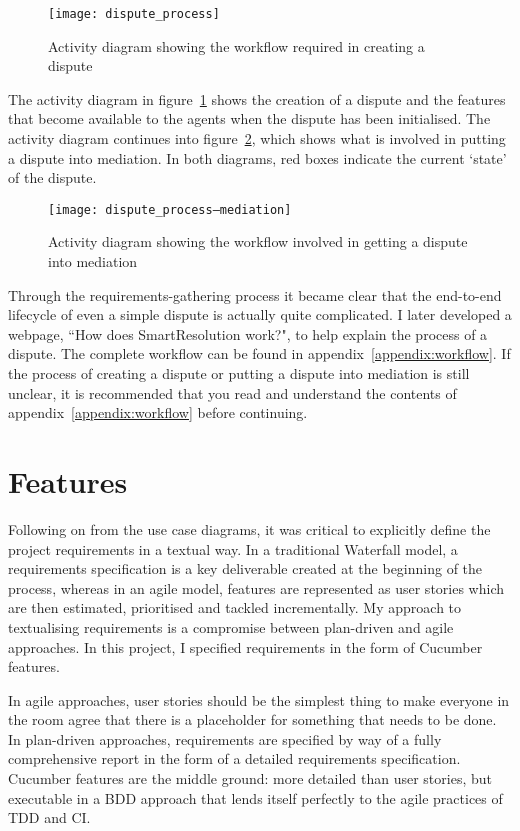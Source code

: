 \begin{figure}[h!]
  \centering
    \ifimages
    \texttt{[image: dispute\_process]}
    \fi
  \caption{Activity diagram showing the workflow required in creating a dispute}
  \label{uml:activity:dispute}
\end{figure}

The activity diagram in figure~\ref{uml:activity:dispute} shows the creation of a dispute and the features that become available to the agents when the dispute has been initialised. The activity diagram continues into figure~\ref{uml:activity:mediation}, which shows what is involved in putting a dispute into mediation. In both diagrams, red boxes indicate the current `state' of the dispute.

\begin{figure}[h!]
  \centering
    \ifimages
    \texttt{[image: dispute\_process--mediation]}
    \fi
  \caption{Activity diagram showing the workflow involved in getting a dispute into mediation}
  \label{uml:activity:mediation}
\end{figure}

Through the requirements-gathering process it became clear that the end-to-end lifecycle of even a simple dispute is actually quite complicated. I later developed a webpage, ``How does SmartResolution work?", to help explain the process of a dispute. The complete workflow can be found in appendix~\ref{appendix:workflow}. If the process of creating a dispute or putting a dispute into mediation is still unclear, it is recommended that you read and understand the contents of appendix~\ref{appendix:workflow} before continuing.

\section{Features}

Following on from the use case diagrams, it was critical to explicitly define the project requirements in a textual way. In a traditional Waterfall model, a requirements specification is a key deliverable created at the beginning of the process, whereas in an agile model, features are represented as user stories which are then estimated, prioritised and tackled incrementally. My approach to textualising requirements is a compromise between plan-driven and agile approaches. In this project, I specified requirements in the form of Cucumber features.

In agile approaches, user stories should be the simplest thing to make everyone in the room agree that there is a placeholder for something that needs to be done. In plan-driven approaches, requirements are specified by way of a fully comprehensive report in the form of a detailed requirements specification. Cucumber features are the middle ground: more detailed than user stories, but executable in a BDD approach that lends itself perfectly to the agile practices of TDD and CI.

